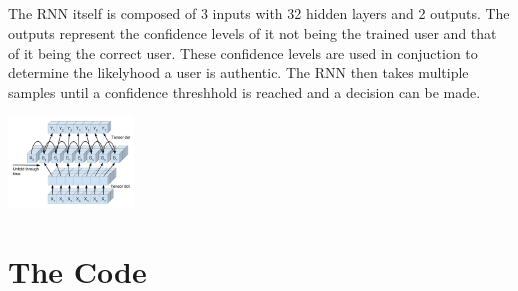 \documentclass[fancychapters]{report}
\begin{document}
\paragraph{}The RNN itself is composed of 3 inputs with 32 hidden layers and 2 outputs.  The outputs represent the confidence levels of it not being the trained user and that of it being the correct user.  These confidence levels are used in conjuction to determine the likelyhood a user is authentic. 
The RNN then takes multiple samples until a confidence threshhold is reached and a decision can be made.
\begin{center}
\includegraphics[width=0.25\textwidth]{RNN}
\end{center}
\chapter{The Code}
\end{document}
